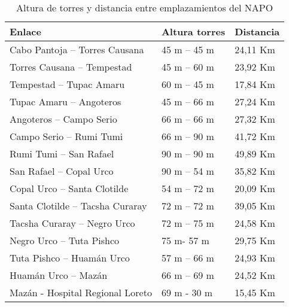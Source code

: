 \begin{table}[H]	
	\begin{center}
		\begin{tabular}{|l|l|l|}
			\hline
			Enlace & Altura torres & Distancia \\
			\hline 
			Cabo Pantoja – Torres Causana & 45 m – 45 m & 24,11 Km \\ \hline	
			Torres Causana – Tempestad & 45 m – 60 m & 23,92 Km \\ \hline
			Tempestad – Tupac Amaru & 60 m – 45 m & 17,84 Km \\ \hline
			Tupac Amaru – Angoteros & 45 m – 66 m & 27,24 Km \\ \hline
			Angoteros – Campo Serio & 66 m – 66 m & 27,32 Km \\ \hline
			Campo Serio – Rumi Tumi & 66 m – 90 m & 41,72 Km \\ \hline
			Rumi Tumi – San Rafael & 90 m – 90 m & 49,89 Km \\ \hline
			San Rafael – Copal Urco & 90 m – 54 m & 35,82 Km \\ \hline
			Copal Urco – Santa Clotilde & 54 m – 72 m & 20,09 Km \\ \hline
			Santa Clotilde – Tacsha Curaray & 72 m – 72 m & 39,05 Km \\ \hline
			Tacsha Curaray – Negro Urco & 72 m – 75 m & 24,58 Km \\ \hline
			Negro Urco – Tuta Pishco & 75 m- 57 m & 29,75 Km \\ \hline
			Tuta Pishco – Huamán Urco & 57 m – 66 m & 24,93 Km \\ \hline
			Huamán Urco – Mazán & 66 m – 69 m & 24,52 Km \\ \hline
			Mazán - Hospital Regional Loreto & 69 m - 30 m & 15,45 Km \\ \hline
		\end{tabular}
	\end{center}
	\caption{Altura de torres y distancia entre emplazamientos del NAPO}
	\label{table:distancias}
\end{table}


